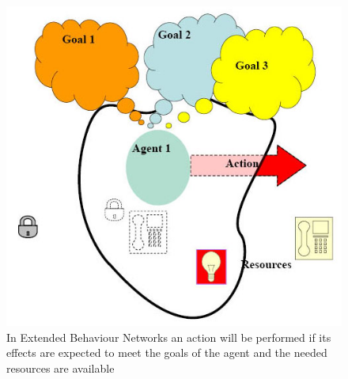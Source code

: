 \documentclass[
		twoside,openright,titlepage,numbers=noenddot,manychapters,
		headinclude,%
                footinclude=false,cleardoublepage=empty,
                BCOR=5mm,
		fontsize=11pt, %
                 enabledeprecatedfontcommands]{scrreprt}
\begin{document}
\begin{figure}[]
\begin{center}
\includegraphics[scale=0.3]{figures/EBN2.jpg}
\caption{In Extended Behaviour Networks an action will be performed if its effects are expected to meet the goals of the agent and the needed resources are available}
\label{fig_EBN2}

\end{center}

\end{figure}
\end{document}
